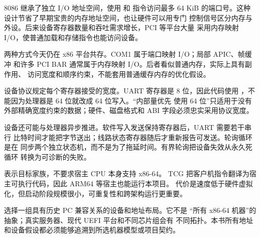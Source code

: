 8086 继承了独立 I/O 地址空间，使用  和  指令访问最多
64 KiB 的端口号。这种设计节省了早期宝贵的内存地址空间，也让硬件可以用专门
控制信号区分内存与外设。后来设备寄存器数量和吞吐需求增长，PCI 等平台大量
采用内存映射 I/O，使普通加载和存储指令也能访问设备。

两种方式今天仍在 x86 平台共存。COM1 属于端口映射 I/O；局部 APIC、帧缓冲
和许多 PCI BAR 通常属于内存映射 I/O。后者看似普通内存，实际上具有副作用、
访问宽度和顺序约束，不能套用普通缓存内存的优化假设。

设备协议规定每个寄存器接受的宽度。UART 寄存器是 8 位，因此代码使用
，不能因为处理器是 64 位就改成 64 位写入。“内部量优先
使用 64 位”只适用于没有外部精确宽度约束的数据；硬件、磁盘格式和 ABI
字段必须忠实采用协议宽度。

设备还可能与处理器异步推进。软件写入发送保持寄存器后，UART 需要若干串行
比特时间才能把字节送出；线路状态寄存器随后才重新报告可发送。轮询循环是在
同步两个独立状态机，而不是为了拖延时间。有界轮询把设备失效从永久死循环
转换为可诊断的失败。

 表示目标家族，不要求宿主 CPU 本身支持 x86-64。
TCG 把客户机指令翻译为宿主可执行代码，因此 ARM64 等宿主也能运行本项目。
代价是速度低于硬件虚拟化，但启动阶段规模很小，可重复性和跨架构运行更重要。

 选择一组具有历史 PC 兼容关系的设备和地址布局。它不是
“所有 x86-64 机器”的抽象；真实服务器、现代 UEFI 平台和不同芯片组会有
不同拓扑。本书所有地址和设备假设都必须能够追溯到所选机器模型或项目契约。
